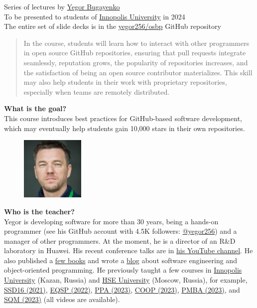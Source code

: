 \documentclass[nobrand,anonymous,nodate,nosecurity]{huawei}
\begin{document}
{

Series of lectures by \href{https://www.yegor256.com}{Yegor Bugayenko} \\
To be presented to students of \href{https://innopolis.university/en/}{Innopolis University} in 2024
\\
The entire set of slide decks is in the \href{https://github.com/yegor256/osbp}{yegor256/osbp} GitHub repository

\begin{abstract}
In the course, students will learn how to interact with other programmers in open source GitHub repositories, ensuring that pull requests integrate seamlessly, reputation grows, the popularity of repositories increases, and the satisfaction of being an open source contributor materializes. This skill may also help students in their work with proprietary repositories, especially when teams are remotely distributed.
\end{abstract}

\textbf{What is the goal?}\\
This course introduces best practices for GitHub-based software development, which may eventually help students gain 10,000 stars in their own repositories.

\begin{figure}%
\raggedleft%
\includegraphics[width=1.2in]{photo.jpg}%
\end{figure}
\textbf{Who is the teacher?}\\
Yegor is developing software for more than 30 years, being a hands-on programmer
(see his GitHub account with 4.5K followers: \href{https://github.com/yegor256}{@yegor256})
and a manager of other programmers. At the moment, he is a director
of an R\&D laboratory in Huawei. His recent conference talks are in
\href{https://www.youtube.com/channel/UCr9qCdqXLm2SU0BIs6d_68Q}{his YouTube channel}.
He also published a \href{https://www.yegor256.com/books.html}{few books}
and wrote a \href{https://www.yegor256.com/contents.html}{blog} about software engineering
and object-oriented programming.
He previously taught a few courses in
\href{https://innopolis.university/}{Innopolis University} (Kazan, Russia)
and
\href{https://hse.ru}{HSE University} (Moscow, Russia),
for example,
\href{https://github.com/yegor256/ssd16}{SSD16 (2021)},
\href{https://github.com/yegor256/eqsp}{EQSP (2022)},
\href{https://github.com/yegor256/ppa}{PPA (2023)},
\href{https://github.com/yegor256/painofoop}{COOP (2023)},
\href{https://github.com/yegor256/pmba}{PMBA (2023)},
and
\href{https://github.com/yegor256/sqm}{SQM (2023)}
(all videos are available).

}
\end{document}
